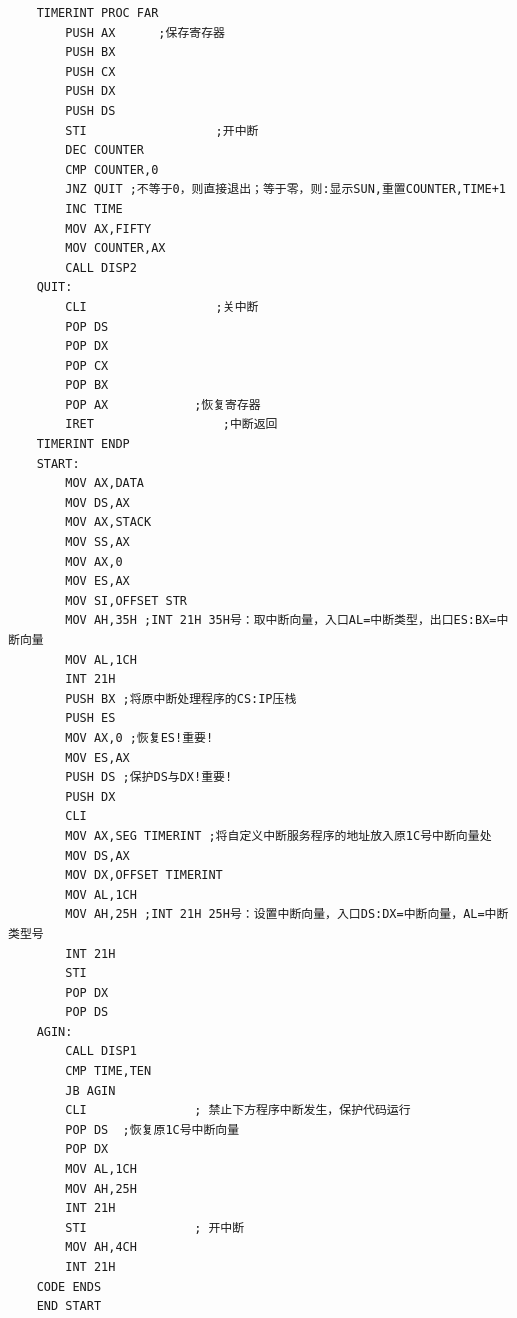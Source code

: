 \documentclass[12pt, a4paper, oneside]{ctexart}
\begin{document}
\begin{lstlisting}
    TIMERINT PROC FAR 
        PUSH AX		 ;保存寄存器
        PUSH BX
        PUSH CX
        PUSH DX
        PUSH DS    
        STI                  ;开中断
        DEC COUNTER
        CMP COUNTER,0
        JNZ QUIT ;不等于0，则直接退出；等于零，则:显示SUN,重置COUNTER,TIME+1
        INC TIME
        MOV AX,FIFTY
        MOV COUNTER,AX 
        CALL DISP2 
    QUIT:
        CLI                  ;关中断
        POP	DS
        POP	DX
        POP	CX
        POP	BX
        POP	AX		      ;恢复寄存器  
        IRET	              ;中断返回
    TIMERINT ENDP
    START:
        MOV AX,DATA 
        MOV DS,AX 
        MOV AX,STACK
        MOV SS,AX
        MOV AX,0
        MOV ES,AX
        MOV SI,OFFSET STR
        MOV AH,35H ;INT 21H 35H号：取中断向量，入口AL=中断类型，出口ES:BX=中断向量
        MOV AL,1CH
        INT 21H 
        PUSH BX ;将原中断处理程序的CS:IP压栈
        PUSH ES 
        MOV AX,0 ;恢复ES!重要!
        MOV ES,AX
        PUSH DS ;保护DS与DX!重要!
        PUSH DX
        CLI
        MOV AX,SEG TIMERINT ;将自定义中断服务程序的地址放入原1C号中断向量处
        MOV DS,AX
        MOV DX,OFFSET TIMERINT
        MOV AL,1CH
        MOV AH,25H ;INT 21H 25H号：设置中断向量，入口DS:DX=中断向量，AL=中断类型号
        INT 21H
        STI
        POP DX 
        POP DS 
    AGIN:
        CALL DISP1
        CMP TIME,TEN
        JB AGIN 
        CLI               ; 禁止下方程序中断发生，保护代码运行
        POP DS  ;恢复原1C号中断向量
        POP DX
        MOV AL,1CH
        MOV AH,25H
        INT 21H
        STI               ; 开中断
        MOV AH,4CH
        INT 21H
    CODE ENDS
    END START     
\end{lstlisting}
\end{document}
